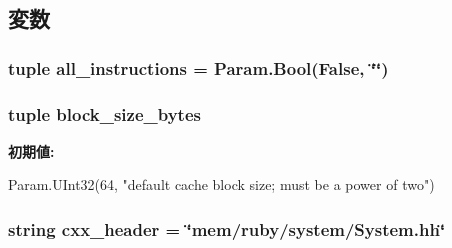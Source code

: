 \subsection{変数}
\hypertarget{classRubySystem_1_1RubySystem_ae13711b8d6db1becb2c7b42b2bd65528}{
\subsubsection[{all\_\-instructions}]{\setlength{\rightskip}{0pt plus 5cm}tuple all\_\-instructions = Param.Bool(False, \char`\"{}\char`\"{})}}
\label{classRubySystem_1_1RubySystem_ae13711b8d6db1becb2c7b42b2bd65528}
\hypertarget{classRubySystem_1_1RubySystem_a9fa848964cfebde5e57a1068aaf0a876}{
\subsubsection[{block\_\-size\_\-bytes}]{\setlength{\rightskip}{0pt plus 5cm}tuple block\_\-size\_\-bytes}}
\label{classRubySystem_1_1RubySystem_a9fa848964cfebde5e57a1068aaf0a876}
{\bfseries 初期値:}
\begin{DoxyCode}
Param.UInt32(64,
        "default cache block size; must be a power of two")
\end{DoxyCode}
\hypertarget{classRubySystem_1_1RubySystem_a17da7064bc5c518791f0c891eff05fda}{
\subsubsection[{cxx\_\-header}]{\setlength{\rightskip}{0pt plus 5cm}string cxx\_\-header = \char`\"{}mem/ruby/system/System.hh\char`\"{}}}
\label{classRubySystem_1_1RubySystem_a17da7064bc5c518791f0c891eff05fda}


